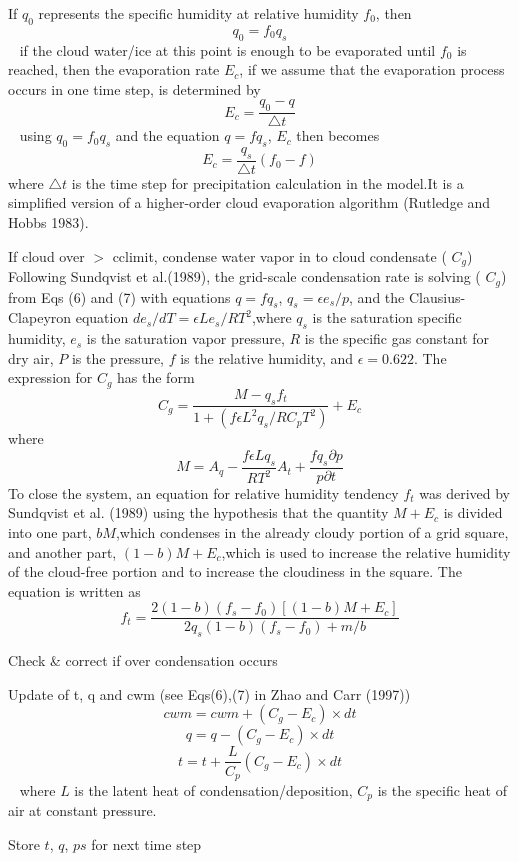 \begin{DoxyEnumerate}
\begin{DoxyItemize}
 If $q_{0}$ represents the specific humidity at relative humidity $f_{0}$, then \[ q_{0}=f_{0}q_{s} \] ~\newline
 if the cloud water/ice at this point is enough to be evaporated until $f_{0}$ is reached, then the evaporation rate $E_{c}$, if we assume that the evaporation process occurs in one time step, is determined by \[ E_{c}=\frac{q_{0}-q}{\triangle t} \] ~\newline
 using $q_{0}=f_{0}q_{s}$ and the equation $q=fq_{s}$, $E_{c}$ then becomes \[ E_{c}=\frac{q_{s}}{\triangle t}(f_{0}-f) \] where $\triangle t$ is the time step for precipitation calculation in the model.\+It is a simplified version of a higher-\/order cloud evaporation algorithm (Rutledge and Hobbs 1983).
\item If cloud over $>$ cclimit, condense water vapor in to cloud condensate ( $C_{g}$) ~\newline
 Following Sundqvist et al.(1989), the grid-\/scale condensation rate is solving ( $C_{g}$) from Eqs (6) and (7) with equations $q=fq_{s}$, $q_{s}=\epsilon e_{s}/p$, and the Clausius-\/\+Clapeyron equation $de_{s}/dT=\epsilon Le_{s}/RT^{2}$,where $q_{s}$ is the saturation specific humidity, $e_{s}$ is the saturation vapor pressure, $R$ is the specific gas constant for dry air, $P$ is the pressure, $f$ is the relative humidity, and $\epsilon=0.622$. The expression for $C_{g}$ has the form \[ C_{g}=\frac{M-q_{s}f_{t}}{1+(f\epsilon L^{2}q_{s}/RC_{p}T^{2})}+E_{c} \] where \[ M=A_{q}-\frac{f\epsilon Lq_{s}}{RT^{2}}A_{t}+\frac{fq_{s}\partial p}{p\partial t} \] To close the system, an equation for relative humidity tendency $f_{t}$ was derived by Sundqvist et al. (1989) using the hypothesis that the quantity $M+E_{c}$ is divided into one part, $bM$,which condenses in the already cloudy portion of a grid square, and another part, $(1-b)M+E_{c}$,which is used to increase the relative humidity of the cloud-\/free portion and to increase the cloudiness in the square. The equation is written as \[ f_{t}=\frac{2(1-b)(f_{s}-f_{0})[(1-b)M+E_{c}]}{2q_{s}(1-b)(f_{s}-f_{0})+m/b} \]
\item Check \& correct if over condensation occurs
\item Update of t, q and cwm (see Eqs(6),(7) in Zhao and Carr (1997)) \[ cwm=cwm+(C_{g}-E_{c})\times dt \] \[ q=q-(C_{g}-E_{c})\times dt \] \[ t=t+\frac{L}{C_{p}}(C_{g}-E_{c})\times dt \] ~\newline
 where $L$ is the latent heat of condensation/deposition, $C_{p}$ is the specific heat of air at constant pressure.
\end{DoxyItemize}
\item Store $t$, $q$, $ps$ for next time step 
\end{DoxyEnumerate}

